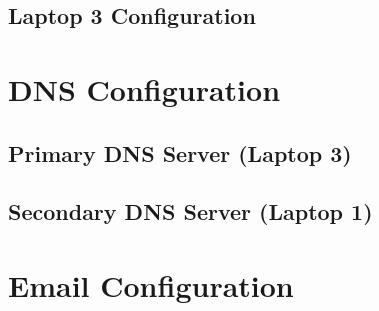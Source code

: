 \section{Laptop 3 Configuration}
\label{app:sec:laptop3}



\chapter{DNS Configuration}
\label{app:dns}

\section{Primary DNS Server (Laptop 3)}



\clearpage

\section{Secondary DNS Server (Laptop 1)}



\clearpage


\chapter{Email Configuration}
\label{app:email}



\endgroup

